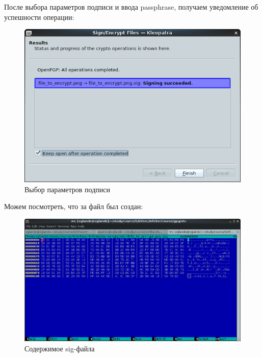 \documentclass[a4paper]{article}
\begin{document}
После выбора параметров подписи и ввода passphrase, получаем уведомление об успешности операции:

\begin{figure}[H]
	\begin{center}
		\includegraphics[scale=0.5]{pics/signing_successful.png}
		\caption{Выбор параметров подписи} 
		\label{pic:pic_name} %
	\end{center}
\end{figure}

Можем посмотреть, что за файл был создан:

\begin{figure}[H]
	\begin{center}
		\includegraphics[scale=0.5]{pics/content_of_sig.png}
		\caption{Содержимое sig-файла} 
		\label{pic:pic_name} %
	\end{center}
\end{figure}
\end{document}
